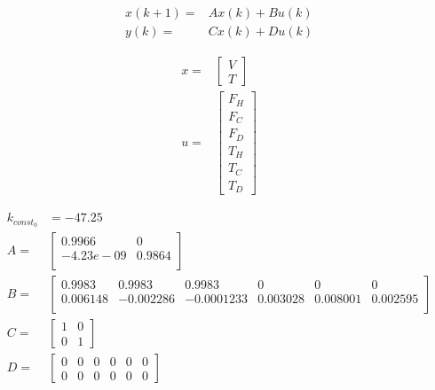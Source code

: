 \begin{equation}
\label{equation:defaultdss}
\begin{aligned}
    x(k+1) = & Ax(k) + Bu(k) \\
    y(k) = & Cx(k) + Du(k)
\end{aligned}
\end{equation}

\begin{equation}
\label{equation:defineddss}
    \begin{aligned}
        x = &
        \begin{bmatrix}
            V \\
            T 
        \end{bmatrix}\\
        u = &
        \begin{bmatrix}
            F_H \\
            F_C \\
            F_D \\
            T_H \\
            T_C \\
            T_D
        \end{bmatrix}
    \end{aligned}
\end{equation}

\begin{equation}
\label{equation:matricesdvals}
    \begin{aligned}
        k_{const_0} &= -47.25\\
        A = &
        \begin{bmatrix}
            0.9966 & 0\\
            -4.23e-09 & 0.9864\\
        \end{bmatrix} \\
        B = &
        \begin{bmatrix}
            0.9983 & 0.9983 & 0.9983 & 0 & 0 & 0\\
            0.006148 & -0.002286 & -0.0001233 & 0.003028 & 0.008001 & 0.002595\\
        \end{bmatrix}\\
        C = &
        \begin{bmatrix}
            1 & 0\\
            0 & 1
        \end{bmatrix}\\
        D = & 
        \begin{bmatrix}
            0 & 0 & 0 & 0 & 0 & 0 \\
            0 & 0 & 0 & 0 & 0 & 0 
        \end{bmatrix}
    \end{aligned}
\end{equation}

